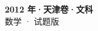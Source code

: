 \documentclass[zihao=-4, a4paper]{ctexart}
\begin{document}
\begin{center}
  {\Large\bfseries 2012 年·天津卷·文科}\\[4pt]
  {\large 数学 · 试题版}
\end{center}
\medskip
{}

\end{document}
